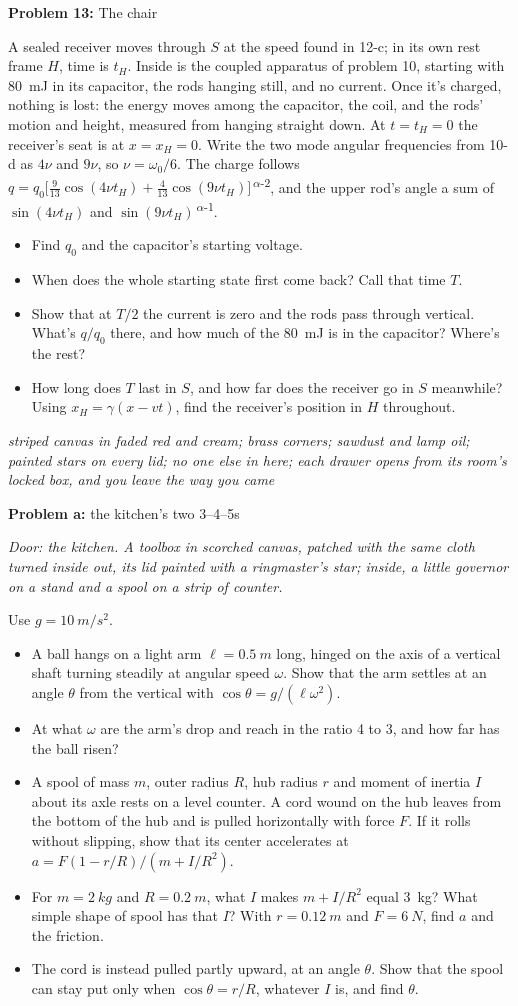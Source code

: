 \documentclass[11pt]{article}
\newcommand{\scene}[1]{\par{\itshape #1}\par}
\newcommand{\problem}[2]{\par\medskip\textbf{Problem #1:} #2\par\nopagebreak}
\newcommand{\appx}[2]{\clearpage{\Large\bfseries Appendix #1: #2}\par\medskip}
\newenvironment{parts}{\begin{itemize}[leftmargin=3.4em,labelwidth=2.8em,labelsep=0.6em,align=left,itemsep=2pt,topsep=3pt]}{\end{itemize}}
\newcommand{\pt}[1]{\item[\textbf{#1}]}
\newcommand{\sv}[1]{\textsuperscript{\dag\,#1}}
\begin{document}
\problem{13}{The chair}
A sealed receiver moves through $S$ at the speed found in 12-c; in its own rest frame $H$, time is $t_H$. Inside is the coupled apparatus of problem 10, starting with \SI{80}{mJ} in its capacitor, the rods hanging still, and no current. Once it's charged, nothing is lost: the energy moves among the capacitor, the coil, and the rods' motion and height, measured from hanging straight down. At $t = t_H = 0$ the receiver's seat is at $x = x_H = 0$. Write the two mode angular frequencies from 10-d as $4\nu$ and $9\nu$, so $\nu = \omega_0/6$. The charge follows $q = q_0\bigl[\frac{9}{13}\cos(4\nu t_H) + \frac{4}{13}\cos(9\nu t_H)\bigr]$\sv{$\alpha$-2}, and the upper rod's angle a sum of $\sin(4\nu t_H)$ and $\sin(9\nu t_H)$\sv{$\alpha$-1}.
\begin{parts}
\pt{13-a} Find $q_0$ and the capacitor's starting voltage.
\pt{13-b} When does the whole starting state first come back? Call that time $T$.
\pt{13-c} Show that at $T/2$ the current is zero and the rods pass through vertical. What's $q/q_0$ there, and how much of the \SI{80}{mJ} is in the capacitor? Where's the rest?
\pt{13-d} How long does $T$ last in $S$, and how far does the receiver go in $S$ meanwhile? Using $x_H = \gamma(x - vt)$, find the receiver's position in $H$ throughout.
\end{parts}

\appx{a}{the cabinet}
\scene{striped canvas in faded red and cream; brass corners; sawdust and lamp oil; painted stars on every lid; no one else in here; each drawer opens from its room's locked box, and you leave the way you came}

\problem{a}{the kitchen's two 3--4--5s}
\scene{Door: the kitchen. A toolbox in scorched canvas, patched with the same cloth turned inside out, its lid painted with a ringmaster's star; inside, a little governor on a stand and a spool on a strip of counter.}
Use $g = \SI{10}{m/s^2}$.
\begin{parts}
\pt{a-1} A ball hangs on a light arm $\ell = \SI{0.5}{m}$ long, hinged on the axis of a vertical shaft turning steadily at angular speed $\omega$. Show that the arm settles at an angle $\theta$ from the vertical with $\cos\theta = g/(\ell\omega^2)$.
\pt{a-2} At what $\omega$ are the arm's drop and reach in the ratio 4 to 3, and how far has the ball risen?
\pt{a-3} A spool of mass $m$, outer radius $R$, hub radius $r$ and moment of inertia $I$ about its axle rests on a level counter. A cord wound on the hub leaves from the bottom of the hub and is pulled horizontally with force $F$. If it rolls without slipping, show that its center accelerates at $a = F(1 - r/R)/(m + I/R^2)$.
\pt{a-4} For $m = \SI{2}{kg}$ and $R = \SI{0.2}{m}$, what $I$ makes $m + I/R^2$ equal \SI{3}{kg}? What simple shape of spool has that $I$? With $r = \SI{0.12}{m}$ and $F = \SI{6}{N}$, find $a$ and the friction.
\pt{a-5} The cord is instead pulled partly upward, at an angle $\theta$. Show that the spool can stay put only when $\cos\theta = r/R$, whatever $I$ is, and find $\theta$.
\end{parts}
\end{document}
